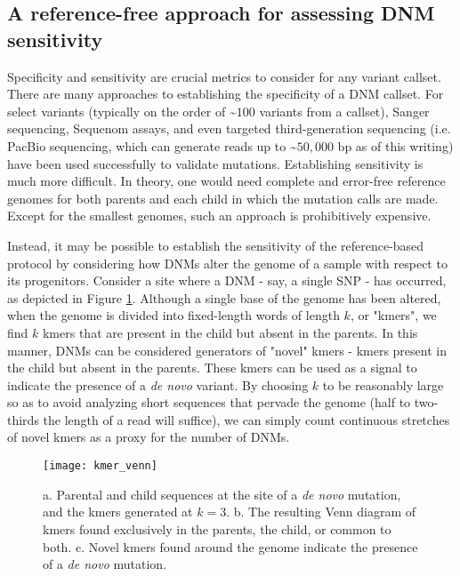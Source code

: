 \subsection{A reference-free approach for assessing DNM sensitivity}

Specificity and sensitivity are crucial metrics to consider for any variant callset.  There are many approaches to establishing the specificity of a DNM callset.  For select variants (typically on the order of \textasciitilde $100$ variants from a callset), Sanger sequencing, Sequenom assays, and even targeted third-generation sequencing (i.e. PacBio sequencing, which can generate reads up to \textasciitilde $50,000$ bp as of this writing) have been used successfully to validate mutations.  Establishing sensitivity is much more difficult.  In theory, one would need complete and error-free reference genomes for both parents and each child in which the mutation calls are made.  Except for the smallest genomes, such an approach is prohibitively expensive.

Instead, it may be possible to establish the sensitivity of the reference-based protocol by considering how DNMs alter the genome of a sample with respect to its progenitors.  Consider a site where a DNM - say, a single SNP - has occurred, as depicted in Figure \ref{fig:kmer_venn}.  Although a single base of the genome has been altered, when the genome is divided into fixed-length words of length $k$, or "kmers", we find $k$ kmers that are present in the child but absent in the parents.  In this manner, DNMs can be considered generators of "novel" kmers - kmers present in the child but absent in the parents.  These kmers can be used as a signal to indicate the presence of a \textit{de novo} variant.  By choosing $k$ to be reasonably large so as to avoid analyzing short sequences that pervade the genome (half to two-thirds the length of a read will suffice), we can simply count continuous stretches of novel kmers as a proxy for the number of DNMs.

\begin{figure}[h!]
  \centering
    \texttt{[image: kmer\_venn]}
  \caption{a. Parental and child sequences at the site of a \textit{de novo} mutation, and the kmers generated at $k=3$.  b. The resulting Venn diagram of kmers found exclusively in the parents, the child, or common to both.  c. Novel kmers found around the genome indicate the presence of a \textit{de novo} mutation.}
  \label{fig:kmer_venn}
\end{figure}

